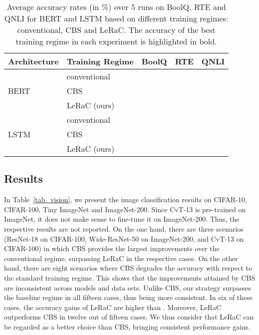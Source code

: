 \documentclass[10pt,twocolumn,letterpaper]{article}
\begin{document}
\begin{table*}[!th]
\small{
  \begin{center}
  \begin{tabular}{llccc}
    \toprule
    Architecture    & Training Regime     & BoolQ          & RTE                 &  QNLI             \\
    \midrule    
      & conventional              &     &    &  \\
    BERT  & CBS \cite{Sinha-NIPS-2020}           &     &    &  \\
      & LeRaC (ours)   &     &    &  \\
    \midrule  
                & conventional              &    &    & \\
    LSTM            & CBS \cite{Sinha-NIPS-2020}           &    &    & \\
                & LeRaC (ours)   &    &    & \\
    \bottomrule
  \end{tabular}
  \end{center}
}
    \vspace{-0.6cm}
    \caption{Average accuracy rates (in \%) over 5 runs on BoolQ, RTE and QNLI for BERT and LSTM based on different training regimes: conventional, CBS \cite{Sinha-NIPS-2020} and LeRaC. The accuracy of the best training regime in each experiment is highlighted in bold.\vspace{-0.4cm}}
  \label{tab_text}
\end{table*}

\vspace{-0.1cm}
\subsection{Results}
\vspace{-0.1cm}

 In Table~\ref{tab_vision}, we present the image classification results on CIFAR-10, CIFAR-100, Tiny ImageNet and ImageNet-200. Since CvT-13 is pre-trained on ImageNet, it does not make sense to fine-tune it on ImageNet-200. Thus, the respective results are not reported. On the one hand, there are three scenarios (ResNet-18 on CIFAR-100, Wide-ResNet-50 on ImageNet-200, and CvT-13 on CIFAR-100) in which CBS provides the largest improvements over the conventional regime, surpassing LeRaC in the respective cases. On the other hand, there are eight scenarios where CBS degrades the accuracy with respect to the standard training regime. This shows that the improvements attained by CBS are inconsistent across models and data sets. Unlike CBS, our strategy surpasses the baseline regime in all fifteen cases, thus being more consistent. In six of these cases, the accuracy gains of LeRaC are higher than . Moreover, LeRaC outperforms CBS in twelve out of fifteen cases. We thus consider that LeRaC can be regarded as a better choice than CBS, bringing consistent performance gains.
\end{document}
